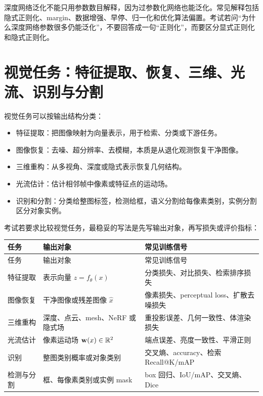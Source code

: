 深度网络泛化不能只用参数数目解释，因为过参数化网络也能泛化。常见解释包括隐式正则化、margin、数据增强、早停、归一化和优化算法偏置。考试若问“为什么深度网络参数很多仍能泛化”，不要回答成一句“正则化”，而要区分显式正则化和隐式正则化。

\section{视觉任务：特征提取、恢复、三维、光流、识别与分割}


视觉任务可以按输出结构分类：

\begin{itemize}
  \item 特征提取：把图像映射为向量表示，用于检索、分类或下游任务。
  \item 图像恢复：去噪、超分辨率、去模糊，本质是从退化观测恢复干净图像。
  \item 三维重构：从多视角、深度或隐式表示恢复几何结构。
  \item 光流估计：估计相邻帧中像素或特征点的运动场。
  \item 识别和分割：分类给整图标签，检测给框，语义分割给每像素类别，实例分割区分对象实例。
\end{itemize}

考试若要求比较视觉任务，最稳妥的写法是先写输出对象，再写损失或评价指标：

\begingroup
\small
\begin{longtable}{L{0.22\textwidth}L{0.35\textwidth}L{0.32\textwidth}}
\toprule
任务 & 输出对象 & 常见训练信号 \\
\midrule
\endfirsthead
\toprule
任务 & 输出对象 & 常见训练信号 \\
\midrule
\endhead
特征提取 & 表示向量 \(z=f_\theta(x)\) & 分类损失、对比损失、检索排序损失 \\
图像恢复 & 干净图像或残差图像 \(\hat x\) & 像素损失、perceptual loss、扩散去噪损失 \\
三维重构 & 深度、点云、mesh、NeRF 或隐式场 & 重投影误差、几何一致性、体渲染损失 \\
光流估计 & 像素运动场 \(\mathbf w(x)\in\mathbb{R}^2\) & 端点误差、亮度一致性、平滑正则 \\
识别 & 整图类别概率或对象类别 & 交叉熵、accuracy、检索 Recall@K/mAP \\
检测与分割 & 框、每像素类别或实例 mask & box 回归、IoU/mAP、交叉熵、Dice \\
\bottomrule
\end{longtable}
\endgroup

